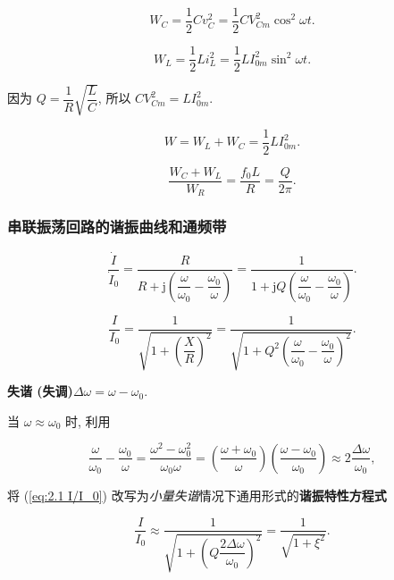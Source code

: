 \documentclass{notes}
\begin{document}
\begin{equation}
    W_C=\frac{1}{2}Cv_C^2=\frac{1}{2}CV_{Cm}^2\cos^2\omega t.
\end{equation}

\begin{equation}
    W_L=\frac{1}{2}Li_L^2=\frac{1}{2}LI_{0m}^2\sin^2\omega t.
\end{equation}

因为 $Q=\dfrac{1}{R}\sqrt{\dfrac{L}{C}}$, 所以 $CV_{Cm}^2=LI_{0m}^2$.

\begin{equation}
    W=W_L+W_C=\frac{1}{2}LI_{0m}^2.
\end{equation}

\begin{equation}
    \frac{W_C+W_L}{W_R}=\frac{f_0L}{R}=\frac{Q}{2\pi}.
\end{equation}

\subsubsection{串联振荡回路的谐振曲线和通频带} \label{串联振荡回路的谐振曲线和通频带}

\begin{equation}
    \frac{\dot{I}}{\dot{I}_0}=\frac{R}{R+\mathrm{j}\left(\dfrac{\omega}{\omega_0}-\dfrac{\omega_0}{\omega}\right)}=\frac{1}{1+\mathrm{j}Q\left(\dfrac{\omega}{\omega_0}-\dfrac{\omega_0}{\omega}\right)}.
\end{equation}

\begin{equation} \label{eq:2.1 I/I_0}
    \frac{I}{I_0}=\frac{1}{\sqrt{1+\left(\dfrac{X}{R}\right)^2}}=\frac{1}{\sqrt{1+Q^2\left(\dfrac{\omega}{\omega_0}-\dfrac{\omega_0}{\omega}\right)^2}}.
\end{equation}

\textbf{失谐 (失调)}\quad $\Delta\omega=\omega-\omega_0$.

当 $\omega\approx\omega_0$ 时, 利用

\begin{equation*}
    \frac{\omega}{\omega_0}-\frac{\omega_0}{\omega}=\frac{\omega^2-\omega_0^2}{\omega_0\omega}=\left(\frac{\omega+\omega_0}{\omega}\right)\left(\frac{\omega-\omega_0}{\omega_0}\right)\approx 2\frac{\Delta\omega}{\omega_0},
\end{equation*}

\noindent 将 (\ref{eq:2.1 I/I_0}) 改写为\textit{小量失谐}情况下通用形式的\textbf{谐振特性方程式}

\begin{equation} \label{eq:2.1 I/I_0 xi}
    \frac{I}{I_0}\approx\frac{1}{\sqrt{1+\left(Q\dfrac{2\Delta\omega}{\omega_0}\right)^2}}=\frac{1}{\sqrt{1+\xi^2}}.
\end{equation}
\end{document}
